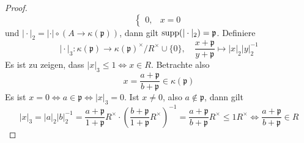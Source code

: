 \begin{proof}
\[\begin{cases}
        0, & x=0
    \end{cases}    
    \]
    und $\vert\cdot\vert_2 = \vert\cdot\vert \circ (A\to \kappa(\mathfrak{p}))$, dann gilt $\operatorname{supp}(\vert\cdot\vert_2) = \mathfrak{p}$. Definiere
    \[
    \vert \cdot\vert_3 : \kappa(\mathfrak{p}) \to \kappa(\mathfrak{p})^\times / R^\times \cup\{0\}, \quad  \frac{x+\mathfrak{p}}{y+\mathfrak{p}} \mapsto \vert x\vert_2 \vert y\vert_2^{-1}    
    \]
    Es ist zu zeigen, dass $\vert x\vert_3 \le 1 \Leftrightarrow x\in R$. Betrachte also 
    \[
    x=\frac{a+\mathfrak{p}}{b+\mathfrak{p}} \in \kappa(\mathfrak{p})    
    \]
    Es ist $x=0 \Leftrightarrow a\in \mathfrak{p} \Leftrightarrow \vert x\vert_3 =0$. Ist $x\neq 0$, also $a\notin \mathfrak{p}$, dann gilt 
    \[
    \vert x\vert_3 = \vert a\vert_2 \vert b\vert_2^{-1} = \frac{a+\mathfrak{p}}{1+\mathfrak{p}}R^\times\cdot \left(\frac{b+\mathfrak{p}}{1+\mathfrak{p}}R^\times\right)^{-1} = \frac{a+\mathfrak{p}}{b+\mathfrak{p}}R^\times \le 1R^\times \Leftrightarrow \frac{a+\mathfrak{p}}{b+\mathfrak{p}} \in R    
    \]
\end{proof}
